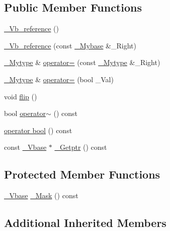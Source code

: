\subsection*{Public Member Functions}
\begin{DoxyCompactItemize}
\item 
\hyperlink{class___vb__reference_aa4a4484ac726d499dd0fa063a7dfa2fa}{\+\_\+\+Vb\+\_\+reference} ()
\item 
\hyperlink{class___vb__reference_ad8ef4be97d965a69ed7d3985316e99f8}{\+\_\+\+Vb\+\_\+reference} (const \hyperlink{class___vb__reference_a9885641a0d5bfa12196f9b2fa497fd0d}{\+\_\+\+Mybase} \&\+\_\+\+Right)
\item 
\hyperlink{class___vb__reference_aa1f6faf9ee4e99f42b9ba34d0ca98705}{\+\_\+\+Mytype} \& \hyperlink{class___vb__reference_ab22320956a99cb27af2facc712d66421}{operator=} (const \hyperlink{class___vb__reference_aa1f6faf9ee4e99f42b9ba34d0ca98705}{\+\_\+\+Mytype} \&\+\_\+\+Right)
\item 
\hyperlink{class___vb__reference_aa1f6faf9ee4e99f42b9ba34d0ca98705}{\+\_\+\+Mytype} \& \hyperlink{class___vb__reference_a770493c45597daca6ec4c63c7edf4e98}{operator=} (bool \+\_\+\+Val)
\item 
void \hyperlink{class___vb__reference_a35fbc073a030672fbbcf06eeb66519f0}{flip} ()
\item 
bool \hyperlink{class___vb__reference_aac4a983f96e3b0e6ed61c2d1cafac0f5}{operator$\sim$} () const 
\item 
\hyperlink{class___vb__reference_a4687d7929ac033538f043c9ab0dbf075}{operator bool} () const 
\item 
const \hyperlink{vector_8h_a1555a2f621ba9ade75bb9ce8bca77144}{\+\_\+\+Vbase} $\ast$ \hyperlink{class___vb__reference_ab97793ab72229e7e965976a6fbb42a00}{\+\_\+\+Getptr} () const 
\end{DoxyCompactItemize}
\subsection*{Protected Member Functions}
\begin{DoxyCompactItemize}
\item 
\hyperlink{vector_8h_a1555a2f621ba9ade75bb9ce8bca77144}{\+\_\+\+Vbase} \hyperlink{class___vb__reference_aec2f9f21fbc9347adb04f0e1c7b4d8db}{\+\_\+\+Mask} () const 
\end{DoxyCompactItemize}
\subsection*{Additional Inherited Members}


